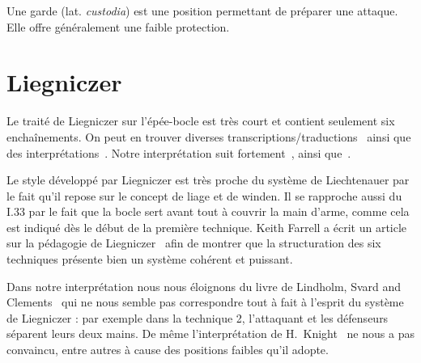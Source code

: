 

\begin{definition}

Une garde (lat. \emph{custodia}) est une position permettant de préparer une attaque.
Elle offre généralement une faible protection.

\end{definition}



\section{Liegniczer}



Le traité de Liegniczer sur l'épée-bocle est très court et contient seulement six enchaînements.
On peut en trouver diverses transcriptions/traductions~\cite{ardamhe:liegniczer, farrell:liegnieczer, lindholm:ringeck_others:2006} ainsi que des interprétations~\cite{farrell:pedagogy_liegnieczer:2014, youtube:sala_armi:liegniczer, youtube:memag:liegniczer, lindholm:ringeck_others:2006, Myers:LiegniczerBuckler, knight:epee_bocle}.
Notre interprétation suit fortement~\cite{youtube:sala_armi:liegniczer, farrell:pedagogy_liegnieczer:2014}, ainsi que~\cite{youtube:memag:liegniczer}.

Le style développé par Liegniczer est très proche du système de Liechtenauer par le fait qu'il repose sur le concept de liage et de winden.
Il se rapproche aussi du I.33 par le fait que la bocle sert avant tout à couvrir la main d'arme, comme cela est indiqué dès le début de la première technique.
Keith Farrell a écrit un article sur la pédagogie de Liegniczer~\cite{farrell:pedagogy_liegnieczer:2014} afin de montrer que la structuration des six techniques présente bien un système cohérent et puissant.

Dans notre interprétation nous nous éloignons du livre de Lindholm, Svard and Clements~\cite{lindholm:ringeck_others:2006} qui ne nous semble pas correspondre tout à fait à l'esprit du système de Liegniczer : par exemple dans la technique 2, l'attaquant et les défenseurs séparent leurs deux mains.
De même l'interprétation de H.\ Knight~\cite[part I]{knight:epee_bocle} ne nous a pas convaincu, entre autres à cause des positions faibles qu'il adopte.

